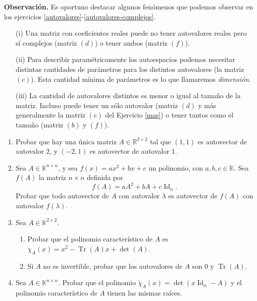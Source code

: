 \textbf{Observación.} Es oportuno destacar algunos fenómenos que podemos observar en los ejercicios \ref{autovalores}-\ref{autovalores-complejos}.
\begin{itemize}
 \item[(i)] Una matriz con coeficientes reales puede no tener autovalores reales pero sí complejos (matriz $(d)$) o tener ambos (matriz $(f)$).
 \item[(ii)] Para describir paramétricamente los autoespacios podemos necesitar distintas cantidades de parámetros para los distintos autovalores (la matriz $(c)$). Esta cantidad mínima de parámetros es lo que llamaremos {\it dimensión}.
 \item[(iii)] La cantidad de autovalores distintos es menor o igual al tama\~no de la matriz. Incluso puede tener un sólo autovalor (matriz $(d)$ y más generalmente la matriz $(e)$ del Ejercicio \ref{mas}) o tener tantos como el tama\~no (matriz $(b)$ y $(f)$).
\end{itemize}

\begin{enumerate}[resume,topsep=6pt,itemsep=.4cm]

\item Probar que hay una única matriz $A\in\mathbb{R}^{2\times 2}$ tal que $(1,1)$ es autovector de autovalor $2$, y $(-2,1)$ es autovector de autovalor $1$.
    

\item Sea $A\in\mathbb{K}^{n\times n}$, y sea $f(x) = ax^2+bx+c$ un polinomio, con $a,b,c\in\mathbb{K}$. Sea $f(A)$ la matriz $n \times n$ definida por
$$f(A) = a A^2+bA+c\operatorname{Id}_n.$$
Probar que todo autovector de $A$ con autovalor $\lambda$ es autovector de $f(A)$ con autovalor $f(\lambda)$.

    
\item Sea $A\in\mathbb{K}^{2\times 2}$.

    \begin{enumerate}     
        \item Probar que el polinomio característico de $A$ es \ $\chi_A(x) = x^2-\operatorname{Tr}(A)x+\det(A)$.
        \item Si $A$ no es invertible, probar que los autovalores de  $A$ son $0$ y $\operatorname{Tr}(A)$.
    \end{enumerate}

\item Sea $A\in\mathbb{K}^{n\times n}$. Probar que el polinomio $\tilde\chi_A(x)=\det(x\operatorname{Id}_n-A)$ y el polinomio característico de $A$ tienen las mismas raíces.

\end{enumerate}


